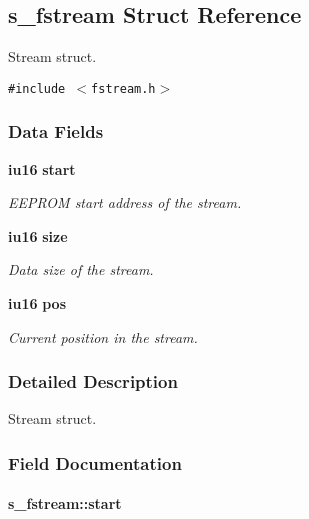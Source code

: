 \subsection{s\_\-fstream Struct Reference}
\label{structs__fstream}
Stream struct.  


{\tt \#include $<$fstream.h$>$}

\subsubsection*{Data Fields}
\begin{CompactItemize}
\item 
{\bf iu16} {\bf start}
\begin{CompactList}\small\item\em EEPROM start address of the stream. \item\end{CompactList}\item 
{\bf iu16} {\bf size}
\begin{CompactList}\small\item\em Data size of the stream. \item\end{CompactList}\item 
{\bf iu16} {\bf pos}
\begin{CompactList}\small\item\em Current position in the stream. \item\end{CompactList}\end{CompactItemize}


\subsubsection{Detailed Description}
Stream struct. 



\subsubsection{Field Documentation}
\paragraph{ {\bf s\_\-fstream::start}}\hfill\label{structs__fstream_4427473894e909d279b9fb12fba358e5}


